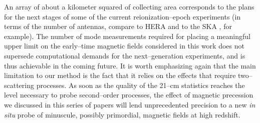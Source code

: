 An array of about a kilometer squared of collecting area corresponds to the plans for the next stages of some of the current reionization--epoch experiments (in terms of the number of antennas, compare to HERA and to the SKA \cite{2008arXiv0802.1727C}, for example). The number of mode measurements required for placing a meaningful upper limit on the early--time magnetic fields considered in this work does not supersede computational demands for the next--generation  experiments, and is thus achievable in the coming future. It is worth emphasizing again that the main limitation to our method is the fact that it relies on the effects that require two--scattering processes. As soon as the quality of the 21--cm statistics reaches the level necessary to probe second--order processes, the effect of magnetic precession we discussed in this series of papers will lend unprecedented precision to a new \textit{in situ} probe of minuscule, possibly primordial, magnetic fields at high redshift. 

  